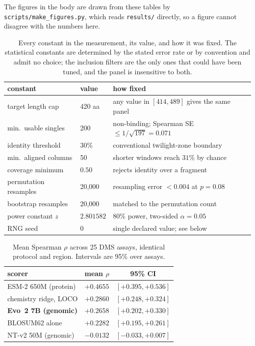 \documentclass[11pt]{article}
\begin{document}
The figures in the body are drawn from these tables by
\texttt{scripts/make\_figures.py}, which reads \texttt{results/} directly, so a
figure cannot disagree with the numbers here.

\begin{table}[t]
\centering\small
\caption{Every constant in the measurement, its value, and how it was fixed. The
statistical constants are determined by the stated error rate or by convention
and admit no choice; the inclusion filters are the only ones that could have been
tuned, and the panel is insensitive to both.}
\label{tab:hyper}
\begin{tabular}{@{}llp{3.1cm}@{}}
\toprule
constant & value & how fixed \\
\midrule
target length cap & 420 aa & any value in $[414,489]$ gives the same panel \\
min.\ usable singles & 200 & non-binding; Spearman SE $\le 1/\sqrt{197}=0.071$ \\
identity threshold & $30\%$ & conventional twilight-zone boundary \\
min.\ aligned columns & 50 & shorter windows reach $31\%$ by chance \\
coverage minimum & $0.50$ & rejects identity over a fragment \\
permutation resamples & 20{,}000 & resampling error $<0.004$ at $p=0.08$ \\
bootstrap resamples & 20{,}000 & matched to the permutation count \\
power constant $z$ & $2.801582$ & $80\%$ power, two-sided $\alpha=0.05$ \\
RNG seed & 0 & single declared value; see below \\
\bottomrule
\end{tabular}
\end{table}

\begin{table}[t]
\caption{Mean Spearman $\rho$ across 25 DMS assays, identical protocol and region.
Intervals are 95\% over assays.}
\label{tab:main}
\centering\small
\begin{tabular}{lcc}
\toprule
scorer & mean $\rho$ & 95\% CI \\
\midrule
ESM-2 650M (protein) & $+0.4655$ & $[+0.395,+0.536]$ \\
chemistry ridge, LOCO & $+0.2860$ & $[+0.248,+0.324]$ \\
\textbf{Evo~2 7B (genomic)} & $\mathbf{+0.2658}$ & $[+0.202,+0.330]$ \\
BLOSUM62 alone & $+0.2282$ & $[+0.195,+0.261]$ \\
NT-v2 50M (genomic) & $-0.0132$ & $[-0.033,+0.007]$ \\
\bottomrule
\end{tabular}
\end{table}
\end{document}

